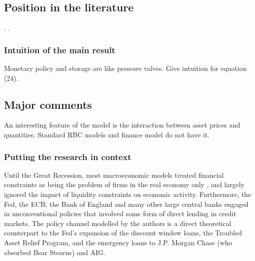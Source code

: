 \documentclass{amsart}
\theoremstyle{definition}
\theoremstyle{remark}
\numberwithin{equation}{section}
\begin{document}
\begin{tikzpicture}



\end{tikzpicture}



\subsection*{Position in the literature}. \cite{gertler2016wholesale}.

\subsubsection*{Intuition of the main result}

Monetary policy and storage are like pressure valves. Give intuition for equation (24).

\subsection*{Major comments} An interesting feature of the model is the interaction between asset prices and quantities. Standard RBC models and finance model do not have it.\\

\subsubsection{Putting the research in context} Until the Great Recession, most macroeconomic models treated financial constraints as being the problem of firms in the real economy only \citep{gertler2010financial}, and largely ignored the impact of liquidity constraints on economic activity. Furthermore, the Fed, the ECB, the Bank of England and many other large central banks engaged in unconventional policies that involved some form of direct lending in credit markets. The policy channel modelled by the authors is a direct theoretical counterpart to the Fed's expansion of the discount window loans, the Troubled Asset Relief Program, and the emergency loans to J.P. Morgan Chase (who absorbed Bear Stearns) and AIG.\\
\end{document}
